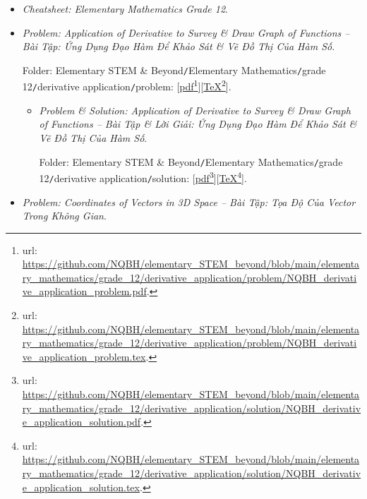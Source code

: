 \documentclass[12pt]{article}
\begin{document}
\begin{itemize}
	\item {\it Cheatsheet: Elementary Mathematics Grade 12}.
	\item {\it Problem: Application of Derivative to Survey \& Draw Graph of Functions -- Bài Tập: Ứng Dụng Đạo Hàm Để Khảo Sát \& Vẽ Đồ Thị Của Hàm Số}.
	
	Folder: {\sf Elementary STEM \& Beyond{\tt/}Elementary Mathematics{\tt/}grade 12{\tt/}derivative application{\tt/}problem}: [\href{https://github.com/NQBH/elementary_STEM_beyond/blob/main/elementary_mathematics/grade_12/derivative_application/problem/NQBH_derivative_application_problem.pdf}{pdf}\footnote{{\sc url}: \url{https://github.com/NQBH/elementary_STEM_beyond/blob/main/elementary_mathematics/grade_12/derivative_application/problem/NQBH_derivative_application_problem.pdf}.}][\href{https://github.com/NQBH/elementary_STEM_beyond/blob/main/elementary_mathematics/grade_12/derivative_application/problem/NQBH_derivative_application_problem.tex}{\TeX}\footnote{{\sc url}: \url{https://github.com/NQBH/elementary_STEM_beyond/blob/main/elementary_mathematics/grade_12/derivative_application/problem/NQBH_derivative_application_problem.tex}.}].
	\begin{itemize}
		\item {\it Problem \& Solution: Application of Derivative to Survey \& Draw Graph of Functions -- Bài Tập \& Lời Giải: Ứng Dụng Đạo Hàm Để Khảo Sát \& Vẽ Đồ Thị Của Hàm Số}.
		
		Folder: {\sf Elementary STEM \& Beyond{\tt/}Elementary Mathematics{\tt/}grade 12{\tt/}derivative application{\tt/}solution}: [\href{https://github.com/NQBH/elementary_STEM_beyond/blob/main/elementary_mathematics/grade_12/derivative_application/solution/NQBH_derivative_application_solution.pdf}{pdf}\footnote{{\sc url}: \url{https://github.com/NQBH/elementary_STEM_beyond/blob/main/elementary_mathematics/grade_12/derivative_application/solution/NQBH_derivative_application_solution.pdf}.}][\href{https://github.com/NQBH/elementary_STEM_beyond/blob/main/elementary_mathematics/grade_12/derivative_application/solution/NQBH_derivative_application_solution.tex}{\TeX}\footnote{{\sc url}: \url{https://github.com/NQBH/elementary_STEM_beyond/blob/main/elementary_mathematics/grade_12/derivative_application/solution/NQBH_derivative_application_solution.tex}.}].
	\end{itemize}
	\item {\it Problem: Coordinates of Vectors in 3D Space -- Bài Tập: Tọa Độ Của Vector Trong Không Gian}.
	

\end{itemize}
\end{document}
